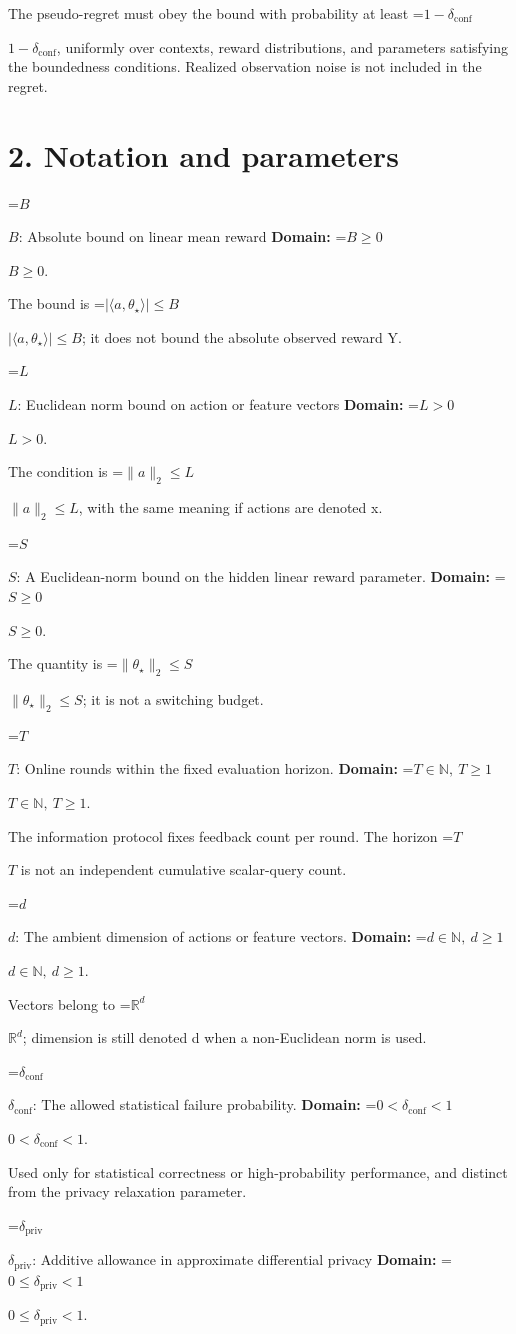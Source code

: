 \documentclass[10pt,a4paper]{article}
\newcommand{\AtlasMath}[1]{\par\begingroup\centering\setbox0=\hbox{$\displaystyle #1$}\ifdim\wd0>1.4\linewidth\typeout{ATLAS WIDE FORMULA: \the\wd0}\fi\ifdim\wd0>\linewidth\resizebox{\linewidth}{!}{\box0}\else\box0\fi\par\endgroup}
\newcommand{\AtlasInlineMath}[1]{\begingroup\setbox0=\hbox{$#1$}\ifdim\wd0>.4\linewidth\endgroup\AtlasMath{#1}\else\endgroup$#1$\fi}
\begin{document}
The pseudo-regret must obey the bound with probability at least \AtlasInlineMath{1-\delta_{\mathrm{conf}}}, uniformly over contexts, reward distributions, and parameters satisfying the boundedness conditions. Realized observation noise is not included in the regret.

\section{2. Notation and parameters}
\AtlasInlineMath{B}: Absolute bound on linear mean reward \textbf{Domain:} \AtlasInlineMath{B\ge0}.

The bound is \AtlasInlineMath{|\langle a,\theta_\star\rangle|\le B}; it does not bound the absolute observed reward Y.

\AtlasInlineMath{L}: Euclidean norm bound on action or feature vectors \textbf{Domain:} \AtlasInlineMath{L>0}.

The condition is \AtlasInlineMath{\|a\|_2\le L}, with the same meaning if actions are denoted x.

\AtlasInlineMath{S}: A Euclidean-norm bound on the hidden linear reward parameter. \textbf{Domain:} \AtlasInlineMath{S\ge0}.

The quantity is \AtlasInlineMath{\|\theta_\star\|_2\le S}; it is not a switching budget.

\AtlasInlineMath{T}: Online rounds within the fixed evaluation horizon. \textbf{Domain:} \AtlasInlineMath{T\in\mathbb N,\ T\ge1}.

The information protocol fixes feedback count per round. The horizon \AtlasInlineMath{T} is not an independent cumulative scalar-query count.

\AtlasInlineMath{d}: The ambient dimension of actions or feature vectors. \textbf{Domain:} \AtlasInlineMath{d\in\mathbb N,\ d\ge1}.

Vectors belong to \AtlasInlineMath{\mathbb R^d}; dimension is still denoted d when a non-Euclidean norm is used.

\AtlasInlineMath{\delta_{\mathrm{conf}}}: The allowed statistical failure probability. \textbf{Domain:} \AtlasInlineMath{0<\delta_{\mathrm{conf}}<1}.

Used only for statistical correctness or high-probability performance, and distinct from the privacy relaxation parameter.

\AtlasInlineMath{\delta_{\mathrm{priv}}}: Additive allowance in approximate differential privacy \textbf{Domain:} \AtlasInlineMath{0\le\delta_{\mathrm{priv}}<1}.
\end{document}
